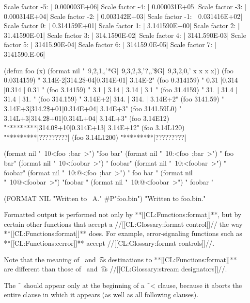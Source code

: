 \code Scale factor -5: | 0.000003E+06| Scale factor -4: | 0.000031E+05| Scale factor -3: | 0.000314E+04| Scale factor -2: | 0.003142E+03| Scale factor -1: | 0.031416E+02| Scale factor  0: | 0.314159E+01| Scale factor  1: | 3.141590E+00| Scale factor  2: | 31.41590E-01| Scale factor  3: | 314.1590E-02| Scale factor  4: | 3141.590E-03| Scale factor  5: | 31415.90E-04| Scale factor  6: | 314159.0E-05| Scale factor  7: | 3141590.E-06| \endcode

\code
 (defun foo (x)
   (format nil "~9,2,1,,'*G|~9,3,2,3,'?,,'\$G|~9,3,2,0,'%
          x x x x))                                     
 (foo 0.0314159) \EV "  3.14E-2|314.2\$-04|0.314E-01|  3.14E-2"
 (foo 0.314159)  \EV "  0.31   |0.314    |0.314    | 0.31    "
 (foo 3.14159)   \EV "   3.1   | 3.14    | 3.14    |  3.1    "
 (foo 31.4159)   \EV "   31.   | 31.4    | 31.4    |  31.    "
 (foo 314.159)   \EV "  3.14E+2| 314.    | 314.    |  3.14E+2"
 (foo 3141.59)   \EV "  3.14E+3|314.2\$+01|0.314E+04|  3.14E+3"
 (foo 3141.59L0) \EV "  3.14L+3|314.2\$+01|0.314L+04|  3.14L+3"
 (foo 3.14E12)   \EV "*********|314.0\$+10|0.314E+13| 3.14E+12"
 (foo 3.14L120)  \EV "*********|?????????|%
 (foo 3.14L1200) \EV "*********|?????????|%

\code
 (format nil "~10<foo~;bar~>")   \EV "foo    bar"
 (format nil "~10:<foo~;bar~>")  \EV "  foo  bar"
 (format nil "~10<foobar~>")     \EV "    foobar"
 (format nil "~10:<foobar~>")    \EV "    foobar"
 (format nil "~10:@<foo~;bar~>") \EV "  foo bar "
 (format nil "~10@<foobar~>")    \EV "foobar    "
 (format nil "~10:@<foobar~>")   \EV "  foobar  " \endcode

 \code
  (FORMAT NIL "Written to ~A." #P"foo.bin")
  \EV "Written to foo.bin." \endcode

\endsubsection%


 Formatted output is performed not only by **[[CL:Functions:format]]**, but by certain other functions that accept a //[[CL:Glossary:format control]]// the way **[[CL:Functions:format]]** does.  For example, error-signaling functions such as **[[CL:Functions:cerror]]** accept //[[CL:Glossary:format controls]]//.

Note that the meaning of \nil\ and \t\ as destinations to **[[CL:Functions:format]]**  are different than those of \nil\ and \t\ as //[[CL:Glossary:stream designators]]//.

The \f{~{\hat}} should appear only at the beginning of a \f{~<} clause, because it aborts the entire clause in which it appears (as well as all following clauses).                                     

\endsubsection%
